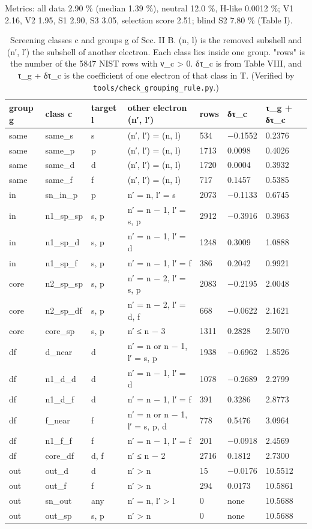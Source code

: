 \documentclass[aps,pra,preprint,superscriptaddress,amsmath,amssymb]{revtex4-2}
\begin{document}
Metrics: all data 2.90 \% (median 1.39 \%), neutral 12.0 \%, H-like 0.0012 \%; V1 2.16, V2 1.95, S1 2.90, S3 3.05, selection score 2.51; blind S2 7.80 \% (Table I).


\begin{table}[htbp]
\caption{Screening classes c and groups g of Sec. II B. (n, l) is the removed subshell and (n′, l′) the subshell of another electron. Each class lies inside one group. "rows" is the number of the 5847 NIST rows with ν\_c > 0. δτ\_c is from Table VIII, and τ\_g + δτ\_c is the coefficient of one electron of that class in T. (Verified by \texttt{tools/check\_grouping\_rule.py}.)}
\footnotesize
\begin{ruledtabular}
\begin{tabular}{lllllll}
group g & class c & target l & other electron (n′, l′) & rows & δτ\_c & τ\_g + δτ\_c \\
\hline
same & same\_s & s & (n′, l′) = (n, l) & 534 & −0.1552 & 0.2376 \\
same & same\_p & p & (n′, l′) = (n, l) & 1713 & 0.0098 & 0.4026 \\
same & same\_d & d & (n′, l′) = (n, l) & 1720 & 0.0004 & 0.3932 \\
same & same\_f & f & (n′, l′) = (n, l) & 717 & 0.1457 & 0.5385 \\
in & sn\_in\_p & p & n′ = n, l′ = s & 2073 & −0.1133 & 0.6745 \\
in & n1\_sp\_sp & s, p & n′ = n − 1, l′ = s, p & 2912 & −0.3916 & 0.3963 \\
in & n1\_sp\_d & s, p & n′ = n − 1, l′ = d & 1248 & 0.3009 & 1.0888 \\
in & n1\_sp\_f & s, p & n′ = n − 1, l′ = f & 386 & 0.2042 & 0.9921 \\
core & n2\_sp\_sp & s, p & n′ = n − 2, l′ = s, p & 2083 & −0.2195 & 2.0048 \\
core & n2\_sp\_df & s, p & n′ = n − 2, l′ = d, f & 668 & −0.0622 & 2.1621 \\
core & core\_sp & s, p & n′ ≤ n − 3 & 1311 & 0.2828 & 2.5070 \\
df & d\_near & d & n′ = n or n − 1, l′ = s, p & 1938 & −0.6962 & 1.8526 \\
df & n1\_d\_d & d & n′ = n − 1, l′ = d & 1078 & −0.2689 & 2.2799 \\
df & n1\_d\_f & d & n′ = n − 1, l′ = f & 391 & 0.3286 & 2.8773 \\
df & f\_near & f & n′ = n or n − 1, l′ = s, p, d & 778 & 0.5476 & 3.0964 \\
df & n1\_f\_f & f & n′ = n − 1, l′ = f & 201 & −0.0918 & 2.4569 \\
df & core\_df & d, f & n′ ≤ n − 2 & 2716 & 0.1812 & 2.7300 \\
out & out\_d & d & n′ > n & 15 & −0.0176 & 10.5512 \\
out & out\_f & f & n′ > n & 294 & 0.0173 & 10.5861 \\
out & sn\_out & any & n′ = n, l′ > l & 0 & none & 10.5688 \\
out & out\_sp & s, p & n′ > n & 0 & none & 10.5688 \\
\end{tabular}
\end{ruledtabular}
\end{table}
\end{document}
